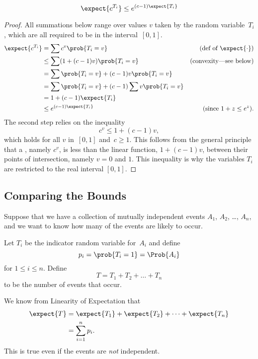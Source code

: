\begin{lemma}
\label{chernoff-lemma2}
\[
    \expect{c^{T_i}} \leq e^{(c - 1) \expect{T_i}}
\]
\end{lemma}

\begin{proof}
All summations below range over values $v$ taken by the random
variable~$T_i$, which are all required to be in the interval~$[0, 1]$.
\begin{align*}
\expect{c^{T_i}}
     & = \sum c^v \prob{T_i = v}
              & \text{(def of $\expect{\cdot}$)}\\
     & \leq \sum (1 + (c-1) v) \prob{T_i = v} 
          & \text{(convexity---see below)}\\
     & = \sum \prob{T_i = v} + (c-1) v \prob{T_i = v} \\
     & = \sum \prob{T_i = v} +  (c-1) \sum v \prob{T_i = v} \\
     & = 1 + (c - 1) \expect{T_i} \\
     & \leq e^{(c - 1) \expect{T_i}}
           & \text{(since $1 + z \leq e^z$)}.
\end{align*}
The second step relies on the inequality
\[
c^v \leq 1 + (c-1) v,
\]
which holds for all $v$ in~$[0, 1]$ and~$c \geq 1$.  This follows from
the general principle that a , namely $c^v$, is
less than the linear function, $1 + (c-1) v$, between their points of
intersection, namely $v = 0$ and $1$.  This inequality is why the
variables $T_i$ are restricted to the real interval $[0, 1]$.
\end{proof}

\subsection{Comparing the Bounds}

Suppose that we have a collection of mutually independent events $A_1$,
$A_2$, \dots, $A_n$, and we want to know how many of the events are
likely to occur.

Let $T_i$ be the indicator random variable for~$A_i$ and define
\begin{equation*}
    p_i = \prob{T_i = 1} = \Prob{A_i}
\end{equation*}
for $1 \le i \le n$.  Define
\begin{equation*}
    T = T_1 + T_2 + \dots + T_n
\end{equation*}
to be the number of events that occur.

We know from Linearity of Expectation that
\begin{align*}
\expect{T}
    &= \expect{T_1} + \expect{T_2} + \dots + \expect{T_n} \\
    &= \sum_{i = 1}^n p_i.
\end{align*}
This is true even if the events are \emph{not} independent.

